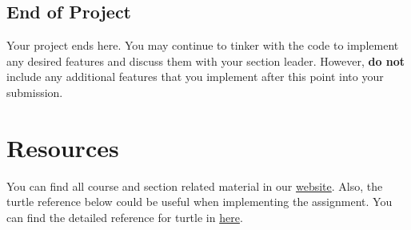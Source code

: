 \documentclass[a4paper]{article}
\begin{document}
\subsection{End of Project}
Your project ends here. You may continue to tinker with the code to implement any desired features and discuss them with your section leader. However, \textbf{do not} include any additional features that you implement after this point into your submission.  

\section{Resources}
You can find all course and section related material in our \href{https://koltpython.com}{website}. Also, the turtle reference below could be useful when implementing the assignment. You can find the detailed reference for turtle in \href{https://docs.python.org/2/library/turtle.html#turtle.circle}{here}. 
\end{document}
